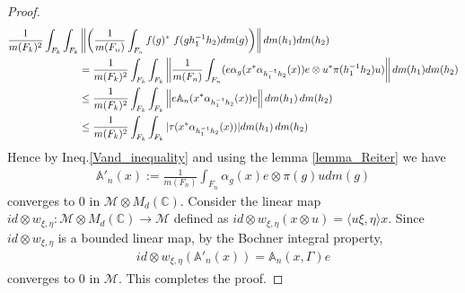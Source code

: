 \documentclass[11pt]{amsart}
\theoremstyle{definition}
\theoremstyle{myremark}
\numberwithin{equation}{section}
\def\A{\mathbb A}
\newcommand{\CM}{\mathcal{M}}
\newcommand{\norm}[1]{\left\Vert#1\right\Vert}
\begin{document}
\begin{proof}
\begin{align}
          \frac{1}{m(F_k)^2} \int_{F_k} \int_{F_k}
&\norm{ \left( \frac{1}{m(F_n)} \int_{F_n}f( g)^* ~ f( gh_{1}^{-1}h_2) dm(g) \right) }dm(h_1) dm(h_2)\notag \\
&=\frac{1}{m(F_k)^2} \int_{F_k} \int_{F_k}\norm{\frac{1}{m(F_n)}\int_{F_n}( e \alpha_g(x^*\alpha_{h_1^{-1}h_2}(x))  e\otimes u^*\pi(h_1^{-1}h_2 )u)}dm(h_1) dm(h_2)\notag \\
&\leq \frac{1}{m(F_k)^2} \int_{F_k} \int_{F_k}\norm{ e \A_n(x^*\alpha_{h_1^{-1}h_2}(x)) e }dm(h_1)\, dm(h_2)\notag \\
&\leq \frac{1}{m(F_k)^2} \int_{F_k} \int_{F_k}|\tau(x^* \alpha_{h_1^{-1}h_2}(x))|dm(h_1)\, dm(h_2)
     \end{align}
 Hence by Ineq.\eqref{Vand_inequality} and using the lemma \ref{lemma_Reiter} we have 
 \begin{align*}
    \A'_n(x):=\frac{1}{m(F_n)}\int_{F_n}\alpha_g(x)e\otimes\pi(g)u dm(g)
\end{align*}
converges to $0$ in $\CM\otimes M_d(\mathbb{C})$. Consider the linear map $id\otimes w_{\xi,\eta}: \CM \otimes M_d(\mathbb{C}) \to \CM$ defined as $id\otimes w_{\xi,\eta}(x\otimes u)=\langle u\xi,\eta\rangle x$. Since $id\otimes w_{\xi,\eta}$ is a bounded linear map, by the Bochner integral property, 
\begin{align*}
  id\otimes w_{\xi,\eta}(\A'_n(x))= \mathbb{A}_n(x,\Gamma)e
\end{align*}
converges to $0$ in $\CM$. This completes the proof.
   \end{proof} 
\end{document}
